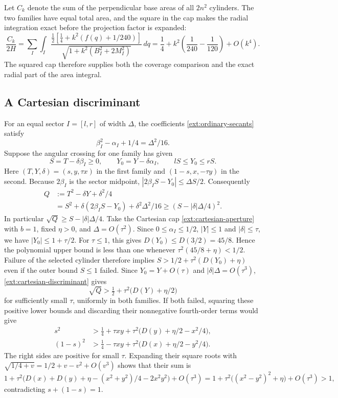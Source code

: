 Let $C_k$ denote the sum of the perpendicular base areas of all $2n^2$
cylinders. The two families have equal total area, and the square in the
cap makes the radial integration exact before the projection factor is
expanded:
\[
 \frac{C_k}{2H}=
 \sum_I\int_I
 \frac{\frac12[\frac14+k^2(f(q)+1/240)]}
 {\sqrt{1+k^2(B_I^2+2M_I^2)}}\,dq
 =\frac14+k^2\left(\frac1{240}-\frac1{120}\right)+O(k^4).
\]
The squared cap therefore supplies both the coverage comparison and
the exact radial part of the area integral.

\subsection{A Cartesian discriminant}
\label{ext:cartesian-direct}
For an equal sector $I=[l,r]$ of width $\Delta$, the coefficients
\eqref{ext:ordinary-secants} satisfy
\[
 \beta_I^2-\alpha_I+1/4=\Delta^2/16.
\]
Suppose the angular crossing for one family has given
\[
 S=T-\delta\beta_I\ge0,\qquad
 Y_0=Y-\delta\alpha_I,\qquad lS\le Y_0\le rS.
\]
Here $(T,Y,\delta)=(s,y,\tau x)$ in the first family and
$(1-s,x,-\tau y)$ in the second.  Because $2\beta_I$ is the sector
midpoint, $|2\beta_IS-Y_0|\le\Delta S/2$.  Consequently
\begin{align}
 Q&:=T^2-\delta Y+\delta^2/4\nonumber\\
  &=S^2+\delta(2\beta_IS-Y_0)+\delta^2\Delta^2/16
    \ge (S-|\delta|\Delta/4)^2.
 \label{ext:cartesian-discriminant}
\end{align}
In particular $\sqrt Q\ge S-|\delta|\Delta/4$.
Take the Cartesian cap \eqref{ext:cartesian-aperture} with $b=1$,
fixed $\eta>0$, and $\Delta=O(\tau^2)$.
Since $0\le\alpha_I\le1/2$, $|Y|\le1$ and $|\delta|\le\tau$,
we have $|Y_0|\le1+\tau/2$.  For $\tau\le1$, this gives
$D(Y_0)\le D(3/2)=45/8$.  Hence the polynomial upper bound is less
than one whenever $\tau^2(45/8+\eta)<1/2$.
Failure of the selected cylinder therefore
implies $S>1/2+\tau^2(D(Y_0)+\eta)$ even if the outer bound $S\le1$
failed.  Since $Y_0=Y+O(\tau)$ and $|\delta|\Delta=O(\tau^3)$,
\eqref{ext:cartesian-discriminant} gives
\[
 \sqrt Q>\tfrac12+\tau^2\bigl(D(Y)+\eta/2\bigr)
\]
for sufficiently small $\tau$, uniformly in both families.
If both failed, squaring these positive lower bounds and discarding
their nonnegative fourth-order terms would give
\begin{align*}
 s^2&>\tfrac14+\tau xy+
          \tau^2\bigl(D(y)+\eta/2-x^2/4\bigr),\\
 (1-s)^2&>\tfrac14-\tau xy+
          \tau^2\bigl(D(x)+\eta/2-y^2/4\bigr).
\end{align*}
The right sides are positive for small $\tau$.  Expanding their square
roots with $\sqrt{1/4+v}=1/2+v-v^2+O(v^3)$ shows that their sum is
\[
 1+\tau^2\bigl(D(x)+D(y)+\eta-(x^2+y^2)/4-2x^2y^2\bigr)
       +O(\tau^3)
 =1+\tau^2\bigl((x^2-y^2)^2+\eta\bigr)+O(\tau^3)>1,
\]
contradicting $s+(1-s)=1$.

